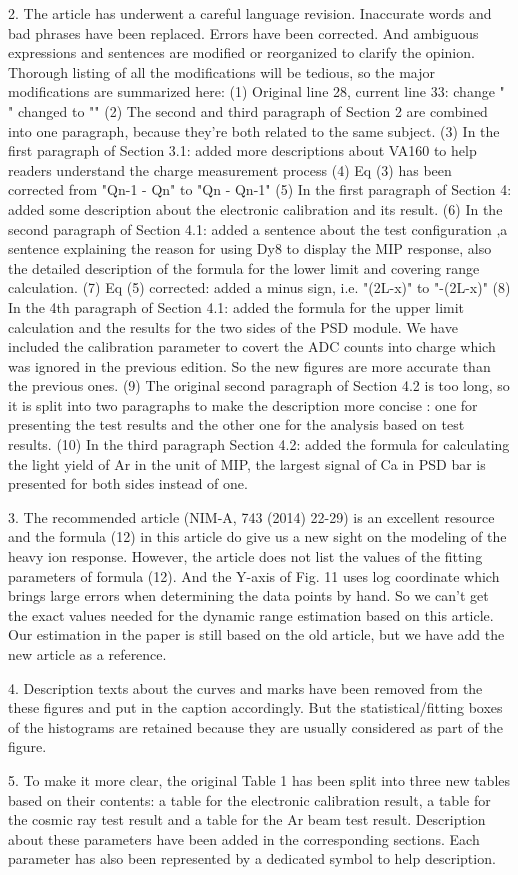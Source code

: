 \documentclass[]{article}
\begin{document}
2. The article has underwent a careful language revision. Inaccurate words and bad phrases have been replaced.  Errors have been corrected. And ambiguous expressions and sentences are modified or reorganized to clarify the opinion. Thorough listing of all the modifications will be tedious, so the major modifications are summarized here:
     (1) Original line 28, current line 33: change "  " changed to "\beta{}"
     (2) The second and third paragraph of Section 2 are combined into one paragraph, because they're both related to the same subject.
     (3) In the first paragraph of Section 3.1: added more descriptions about VA160 to help readers understand the charge measurement process
     (4) Eq (3) has been corrected from "Qn-1 - Qn" to "Qn - Qn-1"
     (5) In the first paragraph of Section 4: added some description about the electronic calibration and its result.
     (6) In the second paragraph of Section 4.1: added a sentence about the test configuration ,a sentence explaining the reason for using Dy8 to display the MIP response, also the detailed description of the formula for the lower limit and covering range calculation.
     (7) Eq (5) corrected: added a minus sign, i.e. "(2L-x)" to "-(2L-x)"
     (8) In the 4th paragraph of Section 4.1: added the formula for the upper limit calculation and the results for the two sides of the PSD module. We have included the calibration parameter to covert the ADC counts into charge which was ignored in the previous edition. So the new figures are more accurate than the previous ones.
     (9) The original second paragraph of Section 4.2 is too long, so it is split into two paragraphs to make the description more concise : one for presenting the test results and the other one for the analysis based on test results.  
     (10) In the third paragraph Section 4.2: added the formula for calculating the light yield of Ar in the unit of MIP, the largest signal of Ca in PSD bar is presented for both sides instead of one.
      

3. The recommended article (NIM-A, 743 (2014) 22-29) is an excellent resource and the formula (12) in this article do give us a new sight on the modeling of the heavy ion response. However, the article does not list the values of the fitting parameters of formula (12). And the Y-axis of Fig. 11 uses log coordinate which brings large errors when determining the data points by hand. So we can't get the exact values needed for the dynamic range estimation based on this article. Our estimation in the paper is still based on the old article, but we have add the new article as a reference.

4. Description texts about the curves and marks have been removed from the these figures and put in the caption accordingly. But the statistical/fitting boxes of the histograms are retained because they are usually considered as part of the figure.

5. To make it more clear, the original Table 1 has been split into three new tables based on their contents: a table for the electronic  calibration result, a table for the cosmic ray test result and a table for the Ar beam test result. Description about these parameters have been added in the corresponding sections. Each parameter has also been represented by a dedicated symbol to help description.
\end{document}
